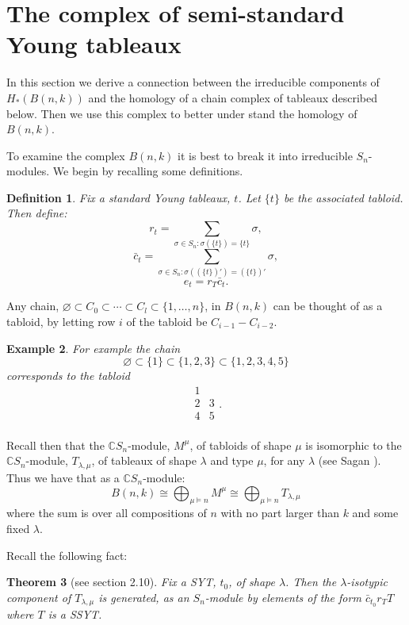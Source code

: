 \documentclass{elsart}
\newtheorem{theorem}{Theorem}[section]
\newtheorem{definition}[theorem]{Definition}
\newtheorem{example}[theorem]{Example}
\newcommand{\C}{\mathbb{C}}
\newcommand{\GC}{\varnothing \subset C_0 \subset \cdots \subset C_l \subset \{1, \ldots, n\}}
\begin{document}
\section{The complex of semi-standard Young tableaux}

In this section we derive a connection between the irreducible components of $H_*(B(n, k))$ and the homology of a chain
complex of tableaux described below. Then we use this complex to better under stand the homology of $B(n, k)$.

To examine the complex $B(n, k)$ it is best to break it into irreducible $S_n$-modules. We begin by recalling some 
definitions.

\begin{definition}
  Fix a standard Young tableaux, $t$. Let $\{t\}$ be the associated tabloid. Then define:
  $$ r_t = \sum_{\sigma \in S_n \colon \sigma(\{t\}) = \{t\}} \sigma,$$
  $$ {\bar c}_t = \sum_{\sigma \in S_n \colon \sigma((\{t\})') = (\{t\})'} \sigma,$$
  $$ e_t = r_T {\bar c_t}.$$
\end{definition}


Any chain, $\GC$,  in $B(n, k)$ can be thought of as a tabloid, by letting row $i$ of 
the tabloid be $C_{i-1} - C_{i-2}$. 

\begin{example} \label{E:chaintooid}
  For example the chain
  $$ \varnothing \subset \{1\} \subset \{1,2,3\} \subset \{1,2,3,4,5\}$$ corresponds to the tabloid
  $$\begin{array}{cc}
    1 &   \\
    2 & 3 \\
    4 & 5 \\
  \end{array}.$$
\end{example}

Recall then that the $\C S_n$-module, $M^\mu$,  of tabloids of shape $\mu$ is isomorphic
to the $\C S_n$-module, $T_{\lambda, \mu}$, of tableaux of shape $\lambda$ and type $\mu$, for any $\lambda$ (see Sagan 
\cite{Sagan}). Thus we have that as a $\C S_n$-module:
$$ B(n, k) \cong \bigoplus_{\mu \models n} M^\mu \cong \bigoplus_{\mu \models n} T_{\lambda, \mu}$$ where the sum is over 
all compositions of $n$ with no part larger than $k$ and some fixed $\lambda$. 

Recall the following fact:

\begin{theorem}[see \cite{Sagan} section 2.10]
  Fix a SYT, $t_0$,  of shape $\lambda$. Then the $\lambda$-isotypic component of $T_{\lambda, \mu}$ is generated, as an
  $S_n$-module by elements of the form $\bar{c}_{t_0} r_T T$ where $T$ is a SSYT. 
\end{theorem}
\end{document}
